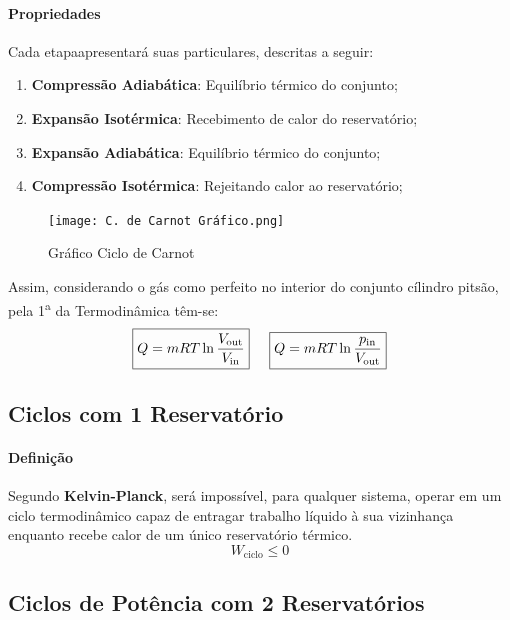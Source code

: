 \documentclass{article}
\begin{document}
        \paragraph{Propriedades}Cada etapaapresentará suas particulares, descritas a seguir:
            \begin{enumerate}[noitemsep]
                \item \textbf{Compressão Adiabática}: Equilíbrio térmico do conjunto;
                \item \textbf{Expansão Isotérmica}: Recebimento de calor do reservatório;
                \item \textbf{Expansão Adiabática}: Equilíbrio térmico do conjunto;
                \item \textbf{Compressão Isotérmica}: Rejeitando calor ao reservatório;
            \end{enumerate}
            \begin{figure}[h]
                \centering
                \texttt{[image: C. de Carnot Gráfico.png]}
                \caption{Gráfico Ciclo de Carnot}
            \end{figure}
        Assim, considerando o gás como perfeito no interior do conjunto cílindro pitsão, pela 1\textsuperscript{a} da Termodinâmica têm-se:
            \[
                \boxed{Q = m R T \ln\frac{V_{\text{out}}}{V_{\text{in}}}} \hspace{5mm}
                \boxed{Q = m R T \ln\frac{p_{\text{in}}}{V_{\text{out}}}}\]

        \subsection{Ciclos com 1 Reservatório}
            \paragraph{Definição}Segundo \textbf{Kelvin-Planck}, será impossível, para qualquer sistema, operar em um ciclo termodinâmico capaz de entragar trabalho líquido à sua vizinhança enquanto recebe calor de um único reservatório térmico.
                \[\boxed{W_\text{ciclo} \leq 0}\]

        \subsection{Ciclos de Potência com 2 Reservatórios}
\end{document}

